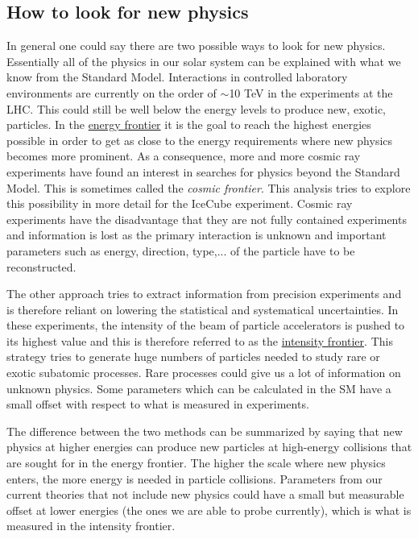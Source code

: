 \subsection{How to look for new physics}
In general one could say there are two possible ways to look for new physics. Essentially all of the physics in our solar system can be explained with what we know from the Standard Model. Interactions in controlled laboratory environments are currently on the order of $\sim$10 TeV in the experiments at the LHC. This could still be well below the energy levels to produce new, exotic, particles. In the \underline{energy frontier} it is the goal to reach the highest energies possible in order to get as close to the energy requirements where new physics becomes more prominent. As a consequence, more and more cosmic ray experiments have found an interest in searches for physics beyond the Standard Model. This is sometimes called the \textit{cosmic frontier}. This analysis tries to explore this possibility in more detail for the IceCube experiment. Cosmic ray experiments have the disadvantage that they are not fully contained experiments and information is lost as the primary interaction is unknown and important parameters such as energy, direction, type,... of the particle have to be reconstructed.

The other approach tries to extract information from precision experiments and is therefore reliant on lowering the statistical and systematical uncertainties. In these experiments, the intensity of the beam of particle accelerators is pushed to its highest value and this is therefore referred to as the \underline{intensity frontier}. This strategy tries to generate huge numbers of particles needed to study rare or exotic subatomic processes. Rare processes could give us a lot of information on unknown physics. Some parameters which can be calculated in the SM have a small offset with respect to what is measured in experiments.

The difference between the two methods can be summarized by saying that new physics at higher energies can produce new particles at high-energy collisions that are sought for in the energy frontier. The higher the scale where new physics enters, the more energy is needed in particle collisions. Parameters from our current theories that not include new physics could have a small but measurable offset at lower energies (the ones we are able to probe currently), which is what is measured in the intensity frontier. \\


